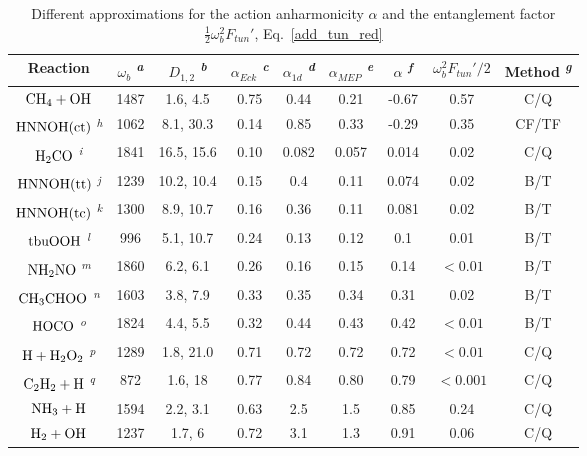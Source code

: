 \documentclass[journal=jpcafh,manuscript=article]{achemso}
\begin{document}
\begin{table}[ht]
\caption{Different approximations for the action anharmonicity
  $\alpha$ and the entanglement factor $\frac{1}{2}\omega_b^2F_{tun}'$, Eq.~\ref{add_tun_red}}
\begin{tabular}{|ccccccccc|} \hline
  Reaction
  & $\omega_b$      \textsuperscript{\emph{a}}
  & $D_{1,2}$            \textsuperscript{\emph{b}}
  & $\alpha_{Eck}$    \textsuperscript{\emph{c}}
  & $\alpha_{1d}$     \textsuperscript{\emph{d}}
  & $\alpha_{MEP}$   \textsuperscript{\emph{e}}
  & $\alpha$            \textsuperscript{\emph{f}} 
  &$\omega_b^2F_{tun}'/2$
  & Method              \textsuperscript{\emph{g}}
  \\ \hline
  $\rm CH_4+OH$
  & 1487  & 1.6, 4.5  & 0.75 & 0.44  & 0.21 & -0.67 & 0.57  & C/Q
  \\
  $\rm HNNOH(ct)$ \textsuperscript{\emph{h}}
  & 1062  & 8.1, 30.3  & 0.14 & 0.85  & 0.33 & -0.29 & 0.35  & CF/TF
  \\
  $\rm H_2CO$ \textsuperscript{\emph{i}}
  & 1841  & 16.5, 15.6  & 0.10 & 0.082  & 0.057 & 0.014 & 0.02  & C/Q
  \\
  $\rm HNNOH(tt)$ \textsuperscript{\emph{j}}
  & 1239  & 10.2, 10.4  & 0.15 & 0.4  & 0.11 & 0.074 & 0.02  & B/T
  \\
  $\rm HNNOH(tc)$ \textsuperscript{\emph{k}}
  & 1300  & 8.9, 10.7  & 0.16 & 0.36  & 0.11 & 0.081 & 0.02  & B/T
  \\
  $\rm tbuOOH$ \textsuperscript{\emph{l}}
  & 996  & 5.1, 10.7  & 0.24 & 0.13  & 0.12 & 0.1 & 0.01  & B/T
  \\
  $\rm NH_2NO$ \textsuperscript{\emph{m}}
  & 1860  & 6.2, 6.1  & 0.26 & 0.16  & 0.15 & 0.14 & $<0.01$ & B/T
  \\
  $\rm CH_3CHOO$ \textsuperscript{\emph{n}} 
  & 1603  & 3.8, 7.9  & 0.33 & 0.35  & 0.34 & 0.31 & 0.02 & B/T
  \\
  $\rm HOCO$ \textsuperscript{\emph{o}}
  & 1824  & 4.4, 5.5  & 0.32 & 0.44  & 0.43 & 0.42 & $<0.01$  & B/T
  \\
  $\rm H+H_2O_2$ \textsuperscript{\emph{p}}
  & 1289  & 1.8, 21.0 & 0.71 & 0.72  & 0.72 & 0.72 & $<0.01$  & C/Q
  \\
  $\rm C_2H_2+H$ \textsuperscript{\emph{q}} 
  & 872  & 1.6, 18  & 0.77 & 0.84  & 0.80 & 0.79 & $<0.001$  & C/Q
  \\
  $\rm NH_3+H$
  & 1594  & 2.2, 3.1 & 0.63 & 2.5  & 1.5 & 0.85 & 0.24  & C/Q
  \\
  $\rm H_2+OH$
  & 1237  & 1.7, 6  & 0.72 &  3.1 & 1.3 & 0.91 & 0.06  & C/Q

\end{tabular}
\end{table}
\end{document}
